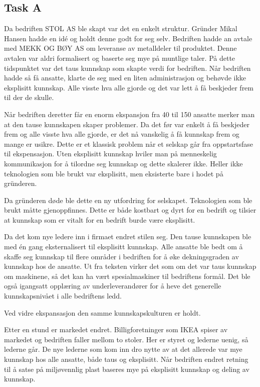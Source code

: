 \subsection{Task A}
Da bedriften STOL AS ble skapt var det en enkelt struktur.
Gründer Mikal Hansen hadde en idé og holdt denne godt for seg selv.
Bedriften hadde an avtale med MEKK OG BØY AS om leveranse av metalldeler til produktet. Denne avtalen var aldri formalisert og baserte seg mye på muntlige taler.
På dette tidspunktet var det taus kunnskap som skapte verdi for bedriften.
Når bedriften hadde så få ansatte, klarte de seg med en liten administrasjon og behøvde ikke eksplisitt kunnskap. Alle visste hva alle gjorde og det var lett å få beskjeder frem til der de skulle.

Når bedriften deretter får en enorm ekspansjon fra 40 til 150 ansatte merker man at den tause kunnskapen skaper problemer. Da det før var enkelt å få beskjeder frem og alle visste hva alle gjorde, er det nå vanskelig å få kunnskap frem og mange er usikre.
Dette er et klassisk problem når et selskap går fra oppstartsfase til ekspensasjon.
Uten eksplisitt kunnskap hviler man på menneskelig kommunikasjon for å tilordne seg kunnskap og dette skalerer ikke.
Heller ikke teknologien som ble brukt var eksplisitt, men eksisterte bare i hodet på gründeren.

Da gründeren døde ble dette en ny utfordring for selskapet. Teknologien som ble brukt måtte gjenoppfinnes.
Dette er både kostbart og dyrt for en bedrift og tilsier at kunnskap som er vitalt for en bedrift burde være eksplisitt.

Da det kom nye ledere inn i firmaet endret stilen seg. Den tause kunnskapen ble med én gang eksternalisert til eksplisitt kunnskap.
Alle ansatte ble bedt om å skaffe seg kunnskap til flere områder i bedriften for å øke dekningsgraden av kunnskap hos de ansatte.
Ut fra teksten virker det som om det var taus kunnskap om maskinene, så det kan ha vært spesialmaskiner til bedriftens formål.
Det ble også igangsatt opplæring av underleverandører for å heve det generelle kunnskapsnivået i alle bedriftens ledd.

Ved vidre ekspansasjon den samme kunnskapskulturen er holdt.

Etter en stund er markedet endret. Billigforetninger som IKEA spiser av markedet og bedriften faller mellom to stoler. Her er styret og lederne uenig, så lederne går.
De nye lederne som kom inn dro nytte av at det allerede var mye kunnskap hos alle ansatte, både taus og eksplisitt.
Når bedriften endret retning til å satse på miljøvennlig plast baseres mye på eksplisitt kunnskap og deling av kunnskap.

